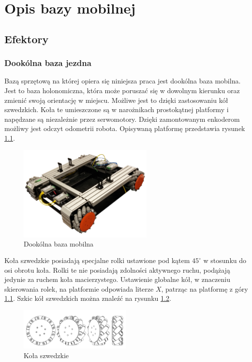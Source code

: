 \chapter{Opis bazy mobilnej}

\section{Efektory}

\subsection{Dookólna baza jezdna}

Bazą sprzętową na której opiera się niniejsza praca jest dookólna baza mobilna. Jest to baza holonomiczna, która może poruszać się w dowolnym kierunku oraz zmienić swoją orientację w miejscu. Możliwe jest to dzięki zastosowaniu kół szwedzkich. Koła te umieszczone są w narożnikach prostokątnej platformy i napędzane są niezależnie przez serwomotory. Dzięki zamontowanym enkoderom możliwy jest odczyt odometrii robota. Opisywaną platformę przedstawia rysunek \ref{fig:omnivelma}.

\begin{figure}[H]
	\centering
	\includegraphics[width=0.6\textwidth]{gfx/omnivelma.png}
	\caption{Dookólna baza mobilna \cite{omnivelma}}
	\label{fig:omnivelma}
\end{figure}

Koła szwedzkie posiadają specjalne rolki ustawione pod kątem $45^{\circ}$ w stosunku do osi obrotu koła. Rolki te nie posiadają zdolności aktywnego ruchu, podążają jedynie za ruchem koła macierzystego. Ustawienie globalne kół, w znaczeniu skierowania rolek, na platformie odpowiada literze $X$, patrząc na platformę z góry \ref{fig:omnivelma}. Szkic kół szwedzkich można znaleźć na rysunku \ref{fig:wheels}.

\begin{figure}[H]
	\centering
	\includegraphics[width=0.5\textwidth]{gfx/wheels.png}
	\caption{Koła szwedzkie \cite{omnivelma}}
	\label{fig:wheels}
\end{figure}

